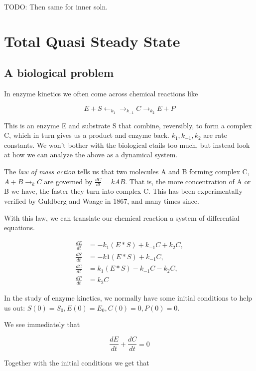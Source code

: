 \documentclass[12pt]{article}
\begin{document}
TODO: Then same for inner soln.

\section{Total Quasi Steady State}

\subsection{A biological problem}

In enzyme kinetics we often come across chemical reactions like

\begin{equation}
E + S \leftarrow_{k_1} \rightarrow_{k_{-1}} C \rightarrow_{k_2} E + P
\end{equation}

This is an enzyme E and substrate S that combine, reversibly, to form a complex
C, which in turn gives us a product and enzyme back. $k_1, k_{-1}, k_2$ are rate
constants. We won't bother with the biological etails too much, but instead look
at how we can analyze the above as a dynamical system.

The \textit{law of mass action} tells us that two molecules A and B forming
complex C, $A+B \rightarrow_k C$ are governed by $\frac{dC}{dt} = kAB$. That is,
the more concentration of A or B we have, the faster they turn into complex C.
This has been experimentally verified by Guldberg and Waage in 1867, and many
times since.

With this law, we can translate our chemical reaction a system of differential
equations.

\begin{align}
\frac{dE}{dt} &= -k_1(E*S) + k_{-1}C + k_2C, \\
\frac{dS}{dt} &= -k1(E*S) + k_{-1}C, \\
\frac{dC}{dt} &= k_1(E*S) - k_{-1}C - k_2C, \\
\frac{dP}{dt} &= k_2C
\end{align}

In the study of enzyme kinetics, we normally have some initial conditions to help
us out: $S(0) = S_0, E(0) = E_0, C(0)=0, P(0)=0$.

We see immediately that

\begin{equation}
\frac{dE}{dt} + \frac{dC}{dt} = 0
\end{equation}

Together with the initial conditions we get that
\end{document}
